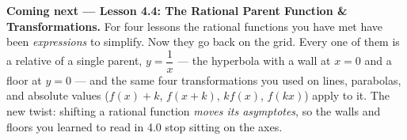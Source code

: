 \documentclass[10pt]{article}
\begin{document}
\begin{spiralbox}
\textbf{Coming next --- Lesson 4.4: The Rational Parent Function \& Transformations.} For four lessons
the rational functions you have met have been \emph{expressions} to simplify. Now they go back on the
grid. Every one of them is a relative of a single parent, $y=\dfrac{1}{x}$ --- the hyperbola with a wall
at $x=0$ and a floor at $y=0$ --- and the same four transformations you used on lines, parabolas, and
absolute values ($f(x)+k$, $f(x+k)$, $kf(x)$, $f(kx)$) apply to it. The new twist: shifting a rational
function \emph{moves its asymptotes}, so the walls and floors you learned to read in 4.0 stop sitting on
the axes.
\end{spiralbox}
\end{document}
